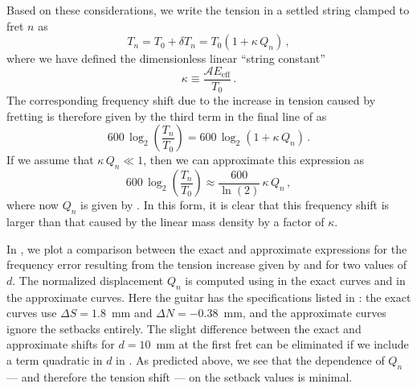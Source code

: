 Based on these considerations, we write the tension in a settled string clamped to fret $n$ as
 \begin{equation} \label{eqn:t_n_def}
T_n = T_0 + \delta T_n = T_0 \left( 1 + \kappa\, Q_n \right)\, ,
 \end{equation}
where we have defined the dimensionless linear ``string constant''
 \begin{equation}\label{eqn:kappa_def}
\kappa \equiv \frac{\mathcal{A} E_\mathrm{eff}}{T_0}\, .
 \end{equation}
The corresponding frequency shift due to the increase in tension caused by fretting is therefore given by the third term in the final line of  as
\begin{equation} \label{eqn:tension_shift}
  600\, \log_2 \left(  \frac{T_n}{T_0} \right) = 600\, \log_2 \left( 1 + \kappa\, Q_n \right)\, .
\end{equation}
If we assume that $\kappa\, Q_n \ll 1$, then we can approximate  this expression as
\begin{equation} \label{eqn:tension_approx}
  600\, \log_2 \left(  \frac{T_n}{T_0} \right) \approx \frac{600}{\ln(2)}\, \kappa\, Q_n\, ,
\end{equation}
where now $Q_n$ is given by . In this form, it is clear that this frequency shift is larger than that caused by the linear mass density by a factor of $\kappa$.

In , we plot a comparison between the exact and approximate expressions for the frequency error resulting from the tension increase given by  and  for two values of $d$. The normalized displacement $Q_n$ is computed using  in the exact curves and  in the approximate curves. Here the guitar has the specifications listed in : the exact curves use $\Delta S = 1.8$~mm and $\Delta N = -0.38$~mm, and the approximate curves ignore the setbacks entirely. The slight difference between the exact and approximate shifts for $d = 10$~mm at the first fret can be eliminated if we include a term quadratic in $d$ in . As predicted above, we see that the dependence of $Q_n$ --- and therefore the tension shift --- on the setback values is minimal.

